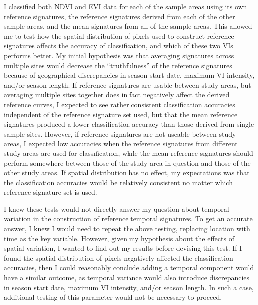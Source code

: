 I classified both NDVI and EVI data for each of the sample areas using its own reference signatures, the reference signatures derived from each of the other sample areas, and the mean signatures from all of the sample areas. This allowed me to test how the spatial distribution of pixels used to construct reference signatures affects the accuracy of classification, and which of these two VIs performs better. My initial hypothesis was that averaging signatures across multiple sites would decrease the “truthfulness” of the reference signatures because of geographical discrepancies in season start date, maximum VI intensity, and/or season length. If reference signatures are usable between study areas, but averaging multiple sites together does in fact negatively affect the derived reference curves, I expected to see rather consistent classification accuracies independent of the reference signature set used, but that the mean reference signatures produced a lower classification accuracy than those derived from single sample sites. However, if reference signatures are not useable between study areas, I expected low accuracies when the reference signatures from different study areas are used for classification, while the mean reference signatures should perform somewhere between those of the study area in question and those of the other study areas. If spatial distribution has no effect, my expectations was that the classification accuracies would be relatively consistent no matter which reference signature set is used.

I knew these tests would not directly answer my question about temporal variation in the construction of reference temporal signatures. To get an accurate answer, I knew I would need to repeat the above testing, replacing location with time as the key variable. However, given my hypothesis about the effects of spatial variation, I wanted to find out my results before devising this test. If I found the spatial distribution of pixels negatively affected the classification accuracies, then I could reasonably conclude adding a temporal component would have a similar outcome, as temporal variance would also introduce discrepancies in season start date, maximum VI intensity, and/or season length. In such a case, additional testing of this parameter would not be necessary to proceed.

